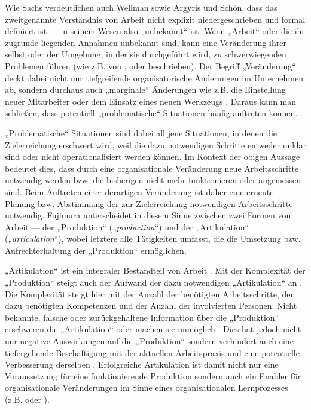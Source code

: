 Wie Sachs verdeutlichen auch Wellman sowie Argyris und Schön, dass das zweitgenannte Verständnis von Arbeit nicht explizit niedergeschrieben und formal definiert ist — in seinem Wesen also „unbekannt“ ist. Wenn „Arbeit“ oder die ihr zugrunde liegenden Annahmen unbekannt sind, kann eine Veränderung ihrer selbst oder der Umgebung, in der sie durchgeführt wird, zu schwerwiegenden Problemen führen (wie z.B. von \cite{Nonaka95}, \cite{Krogh00} oder \cite{Gerson86} beschrieben). Der Begriff „Veränderung“ deckt dabei nicht nur tiefgreifende organisatorische Änderungen im Unternehmen ab, sondern durchaus auch „marginale“ Änderungen wie z.B. die Einstellung neuer Mitarbeiter oder dem Einsatz eines neuen Werkzeugs \cite{Olesen03}. Daraus kann man schließen, dass potentiell „problematische“ Situationen häufig auftreten können. 

„Problematische“ Situationen sind dabei all jene Situationen, in denen die Zielerreichung erschwert wird, weil die dazu notwendigen Schritte entweder unklar sind oder nicht operationalisiert werden können. Im Kontext der obigen Aussage bedeutet dies, dass durch eine organisationale Veränderung neue Arbeitsschritte notwendig werden bzw. die bisherigen nicht mehr funktionieren oder angemessen sind. Beim Auftreten einer derartigen Veränderung ist daher eine erneute Planung bzw. Abstimmung der zur Zielerreichung notwendigen Arbeitsschritte notwendig. Fujimura \cite{Fujimura87} unterscheidet in diesem Sinne zwischen zwei Formen von Arbeit — der „Produktion“ („\emph{production}“) und der „Artikulation“ („\emph{articulation}“), wobei letztere alle Tätigkeiten umfasst, die die Umsetzung bzw. Aufrechterhaltung der „Produktion“ ermöglichen.

„Artikulation“ ist ein integraler Bestandteil von Arbeit \cite{Strauss85}. Mit der Komplexität der „Produktion“ steigt auch der Aufwand der dazu notwendigen „Artikulation“ an \cite{Strauss88}. Die Komplexität steigt hier mit der Anzahl der benötigten Arbeitsschritte, den dazu benötigten Kompetenzen und der Anzahl der involvierten Personen. Nicht bekannte, falsche oder zurückgehaltene Information über die „Produktion“ erschweren die „Artikulation“ oder machen sie unmöglich \cite{Fujimura87}. Dies hat jedoch nicht nur negative Auswirkungen auf die „Produktion“ sondern verhindert auch eine tiefergehende Beschäftigung mit der aktuellen Arbeitspraxis und eine potentielle Verbesserung derselben \cite{Argyris78}. Erfolgreiche Artikulation ist damit nicht nur eine Voraussetzung für eine funktionierende Produktion sondern auch ein Enabler für organisationale Veränderungen im Sinne eines organisationalen Lernprozesses (z.B. \cite{Kim93} oder \cite{Firestone03a}).

